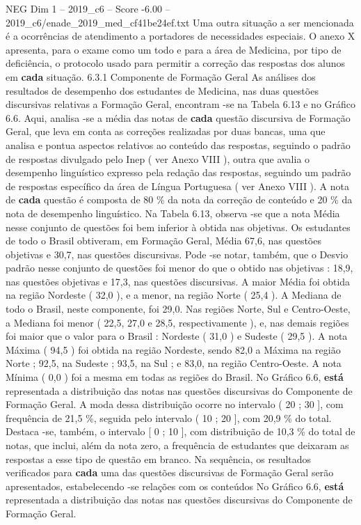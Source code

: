 \begin{textsample}{NEG Dim 1 – 2019\_c6 – Score -6.00 – 2019\_c6/enade\_2019\_med\_cf41be24ef.txt}
Uma outra situação a ser mencionada é a ocorrências de atendimento a portadores de necessidades especiais.
O anexo X apresenta, para o exame como um todo e para a área de Medicina, por tipo de deficiência, o protocolo usado para permitir a correção das respostas dos alunos em \textbf{cada} situação. 6.3.1 Componente de Formação Geral As análises dos resultados de desempenho dos estudantes de Medicina, nas duas questões discursivas relativas a Formação Geral, encontram -se na Tabela 6.13 e no Gráfico 6.6.
Aqui, analisa -se a média das notas de \textbf{cada} questão discursiva de Formação Geral, que leva em conta as correções realizadas por duas bancas, uma que analisa e pontua aspectos relativos ao conteúdo das respostas, seguindo o padrão de respostas divulgado pelo Inep ( ver Anexo VIII ), outra que avalia o desempenho linguístico expresso pela redação das respostas, seguindo um padrão de respostas específico da área de Língua Portuguesa ( ver Anexo VIII ).
A nota de \textbf{cada} questão é composta de 80 \% da nota da correção de conteúdo e 20 \% da nota de desempenho linguístico.
Na Tabela 6.13, observa -se que a nota Média nesse conjunto de questões foi bem inferior à obtida nas objetivas.
Os estudantes de todo o Brasil obtiveram, em Formação Geral, Média 67,6, nas questões objetivas e 30,7, nas questões discursivas.
Pode -se notar, também, que o Desvio padrão nesse conjunto de questões foi menor do que o obtido nas objetivas : 18,9, nas questões objetivas e 17,3, nas questões discursivas.
A maior Média foi obtida na região Nordeste ( 32,0 ), e a menor, na região Norte ( 25,4 ).
A Mediana de todo o Brasil, neste componente, foi 29,0.
Nas regiões Norte, Sul e Centro-Oeste, a Mediana foi menor ( 22,5, 27,0 e 28,5, respectivamente ), e, nas demais regiões foi maior que o valor para o Brasil : Nordeste ( 31,0 ) e Sudeste ( 29,5 ).
A nota Máxima ( 94,5 ) foi obtida na região Nordeste, sendo 82,0 a Máxima na região Norte ; 92,5, na Sudeste ; 93,5, na Sul ; e 83,0, na região Centro-Oeste.
A nota Mínima ( 0,0 ) foi a mesma em todas as regiões do Brasil.
No Gráfico 6.6, \textbf{está} representada a distribuição das notas nas questões discursivas do Componente de Formação Geral.
A moda dessa distribuição ocorre no intervalo ( 20 ; 30 ], com frequência de 21,5 \%, seguida pelo intervalo ( 10 ; 20 ], com 20,9 \% do total.
Destaca -se, também, o intervalo [ 0 ; 10 ], com distribuição de 10,3 \% do total de notas, que inclui, além da nota zero, a frequência de estudantes que deixaram as respostas a esse tipo de questão em branco.
Na sequência, os resultados verificados para \textbf{cada} uma das questões discursivas de Formação Geral serão apresentados, estabelecendo -se relações com os conteúdos No Gráfico 6.6, \textbf{está} representada a distribuição das notas nas questões discursivas do Componente de Formação Geral.

\end{textsample}
